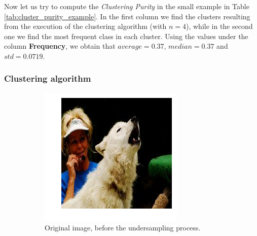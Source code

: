\documentclass[12pt, twoside, a4paper]{report}
\begin{document}
Now let us try to compute the \textit{Clustering Purity} in the small example in Table \ref{tab:cluster_purity_example}. In the first column we find the clusters resulting from the execution of the clustering algorithm (with $n=4$), while in the second one we find the most frequent class in each cluster. Using the values under the column \textbf{Frequency}, we obtain that $average=0.37$, $median=0.37$ and $std=0.0719$.


\subsubsection{Clustering algorithm}



\begin{figure}
\centering
\begin{subfigure}[b]{.49\linewidth}
\includegraphics[width=\linewidth]{images/undersamp-orig.png}
\caption{Original image, before the undersampling process.}
\label{subfig:undersamp-orig}
\end{subfigure}
\begin{subfigure}[b]{.465\linewidth}

\end{subfigure}
\end{figure}
\end{document}

